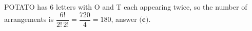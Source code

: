POTATO has $6$ letters with O and T each appearing twice, so the number of arrangements is $\dfrac{6!}{2!\,2!}=\dfrac{720}{4}=180$, answer $\boxed{\textbf{(c)}}$.
